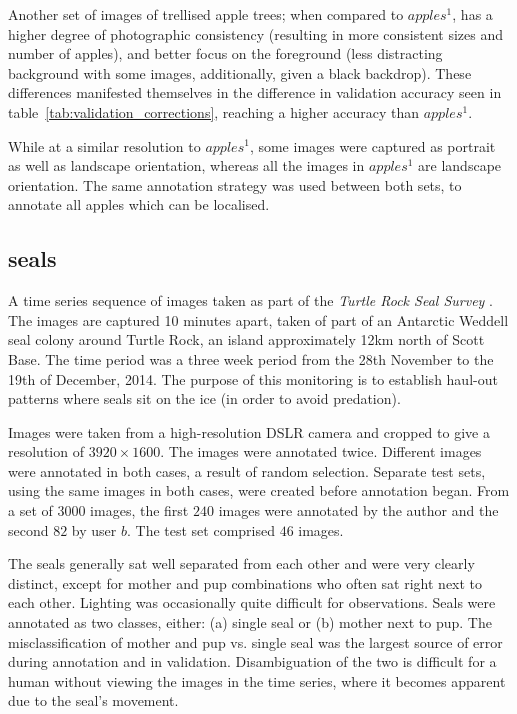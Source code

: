 Another set of images of trellised apple trees; when compared to \emph{$apples^1$}, has a higher degree of  photographic consistency (resulting in more consistent sizes and number of apples), and better focus on the foreground (less distracting background with some images, additionally, given a black backdrop). These differences manifested themselves in the difference in validation accuracy seen in table~\ref{tab:validation_corrections}, reaching a higher accuracy than \emph{$apples^1$}.

While at a similar resolution to \emph{$apples^1$}, some images were captured as portrait as well as landscape orientation, whereas all the images in \emph{$apples^1$} are landscape orientation. The same annotation strategy was used between both sets, to annotate all apples which can be localised.

\subsection{seals}
    
 A time series sequence of images taken as part of the \emph{Turtle Rock Seal Survey} \cite{Eisert2015}. The images are captured 10 minutes apart, taken of part of an Antarctic Weddell seal colony around Turtle Rock, an island approximately 12km north of Scott Base. The time period was a three week period from the 28th November to the 19th of December, 2014. The purpose of this monitoring is to establish haul-out patterns where seals sit on the ice (in order to avoid predation).  

Images were taken from a high-resolution DSLR camera and cropped to give a resolution of $3920\times1600$. The images were annotated twice. Different images were annotated in both cases, a result of random selection. Separate test sets, using the same images in both cases, were created before annotation began. From a set of $3000$ images, the first $240$ images were annotated by the author and the second $82$ by user $b$. The test set comprised $46$ images.

The seals generally sat well separated from each other and were very clearly distinct, except for mother and pup combinations who often sat right next to each other. Lighting was occasionally quite difficult for observations. Seals were annotated as two classes, either: (a) single seal or (b) mother next to pup.  The misclassification of mother and pup vs. single seal was the largest source of error during annotation and in validation. Disambiguation of the two is difficult for a human without viewing the images in the time series, where it becomes apparent due to the seal's movement.

